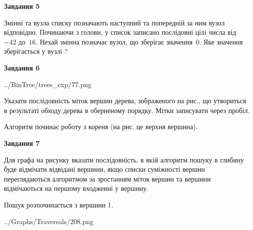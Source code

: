 \documentclass[12pt, ukrainian]{article}
\begin{document}
{\begin {large}
{\begin {center}\textbf{Завдання 5}\end {center}}\par
Змінні  та  вузла списку позначають наступний та попередній за ним вузол відповідно. Починаючи з голови, у список записано послідовні цілі числа від~$-42$ до~$16$. Нехай змінна  позначає вузол, що зберігає значення~$0$.
Яке значення зберігається у вузлі  ?\par
\newpage

{\begin {center}\textbf{Завдання 6}\end {center}}\par

\begin{center}
	{../BinTree/trees_exp/77.png}
\end{center}
Указати послідовність міток вершин дерева, зображеного на рис., що утвориться в результаті обходу дерева в оберненому порядку. Мітки записувати через пробіл.\par Алгоритм починає роботу з кореня (на рис. це верхня вершина).\par
\newpage

{\begin {center}\textbf{Завдання 7}\end {center}}\par
Для графа на рисунку вказати послідовність, в якій алгоритм пошуку в глибину буде відмічати відвідані вершини, якщо списки суміжності вершин переглядаються алгоритмом за зростанням міток вершин та вершини відмічаються на першому вход\-женні у вершину.\par
Пошук розпочинається з вершини 1.\par

\begin{center}
	{../Graphs/Traversals/208.png}
\end{center}\par
\newpage


\end{large}}
\end{document}
